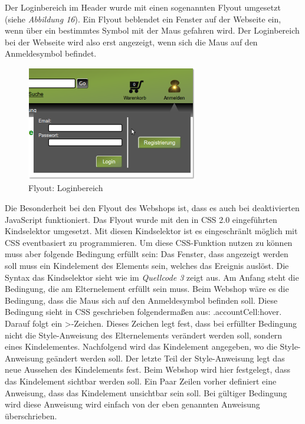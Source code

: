 Der Loginbereich im Header wurde mit einen sogenannten \glqq Flyout\grqq{} umgesetzt (siehe \textit{Abbildung 16}). Ein Flyout beblendet ein Fenster auf der Webseite ein, wenn über ein bestimmtes Symbol mit der Maus gefahren wird. Der Loginbereich bei der Webseite wird also erst angezeigt, wenn sich die Maus auf den Anmeldesymbol befindet. 

\begin{figure}[H]
	\begin{center}
			\includegraphics[width=75mm]{Bilder/Abbildung14_Loginbereich.png}
	\end{center}
	\caption{Flyout: Loginbereich}
\end{figure}

Die Besonderheit bei den Flyout des Webshops ist, dass es auch bei deaktivierten JavaScript funktioniert.  Das Flyout wurde mit den in CSS 2.0 eingeführten \glqq Kindselektor\grqq{} umgesetzt. Mit diesen \glqq Kindselektor\grqq{} ist es eingeschränlt möglich mit CSS eventbasiert zu programmieren. Um diese CSS-Funktion nutzen zu können muss aber folgende Bedingung erfüllt sein: Das Fenster, dass angezeigt werden soll muss ein Kindelement des Elements sein, welches das Ereignis auslöst. Die Syntax das \glqq Kindselektor\grqq{} sieht wie im \textit{Quellcode 3} zeigt aus. Am Anfang steht die Bedingung, die am Elternelement erfüllt sein muss. Beim Webshop wäre es die Bedingung, dass die Maus sich auf den Anmeldesymbol befinden soll. Diese Bedingung sieht in CSS geschrieben folgendermaßen aus: \glqq .accountCell:hover\grqq{}. Darauf folgt ein \glqq >\grqq{}-Zeichen. Dieses Zeichen legt fest, dass bei erfüllter Bedingung nicht die Style-Anweisung des Elternelements verändert werden soll, sondern eines Kindelementes. Nachfolgend wird das Kindelement angegeben, wo die Style-Anweisung geändert werden soll. Der letzte Teil der Style-Anweisung legt das neue Aussehen des Kindelements fest. Beim Webshop wird hier festgelegt, dass das Kindelement sichtbar werden soll. Ein Paar Zeilen vorher definiert eine Anweisung, dass das Kindelement unsichtbar sein soll. Bei gültiger Bedingung wird diese Anweisung wird einfach von der eben genannten Anweisung überschrieben.

